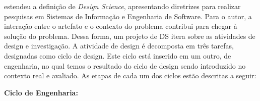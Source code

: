 
\citet{wieringa2014design} estendeu a definição de \textit{Design Science}, apresentando diretrizes para realizar pesquisas em Sistemas de Informação e Engenharia de Software. Para o autor, a interação entre o artefato e o contexto do problema contribui para chegar à solução do problema. Dessa forma, um projeto de DS itera sobre as atividades de design e investigação. A atividade de design é decomposta em três tarefas, designadas como ciclo de design. Este ciclo está inserido em um outro, de engenharia, no qual temos o resultado do ciclo de design sendo introduzido no contexto real e avaliado. As etapas de cada um dos ciclos estão descritas a seguir:

\noindent \textbf{Ciclo de Engenharia:}

